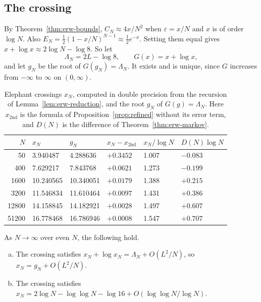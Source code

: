 \subsection{The crossing}

By Theorem~\ref{thm:erw-bounds},
$C_N\approx4x/N^2$ when $\varepsilon=x/N$ and $x$ is of order $\log N$. Also
$E_N=\frac12(1-x/N)^{N-1}\approx\frac12e^{-x}$. Setting them equal gives
$x+\log x\approx2\log N-\log8$. So let
\[
 \Lambda_N=2L-\log8,\qquad G(x)=x+\log x,
\]
and let $g_N$ be the root of $G(g_N)=\Lambda_N$. It exists and is unique,
since $G$ increases from $-\infty$ to $\infty$ on $(0,\infty)$.

\begin{table}[t]
\centering\small
\begin{tabular}{@{}rlllll@{}}
\toprule
$N$ & $x_N$ & $g_N$ & $x_N-x_{\mathrm{2nd}}$ & $x_N/\log N$ & $D(N)\log N$\\
\midrule
50 & 3.940487 & 4.288636 & $+0.3452$ & 1.007 & $-0.083$\\
400 & 7.629217 & 7.843768 & $+0.0621$ & 1.273 & $-0.199$\\
1600 & 10.240565 & 10.340051 & $+0.0179$ & 1.388 & $+0.215$\\
3200 & 11.546834 & 11.610464 & $+0.0097$ & 1.431 & $+0.386$\\
12800 & 14.158845 & 14.182921 & $+0.0028$ & 1.497 & $+0.607$\\
51200 & 16.778468 & 16.786946 & $+0.0008$ & 1.547 & $+0.707$\\
\bottomrule
\end{tabular}
\caption{Elephant crossings $x_N$, computed in double precision from the
recursion of Lemma~\ref{lem:erw-reduction}, and the root $g_N$ of
$G(g)=\Lambda_N$. Here $x_{\mathrm{2nd}}$ is the formula of
Proposition~\ref{prop:refined} without its error term, and $D(N)$ is the
difference of Theorem~\ref{thm:erw-markov}.}
\label{tab:erw-crossing}
\end{table}

\begin{theorem}\label{thm:erw-crossing}
As $N\to\infty$ over even $N$, the following hold.
\begin{enumerate}[(a)]
\item The crossing satisfies $x_N+\log x_N=\Lambda_N+O(L^2/N)$, so
$x_N=g_N+O(L^2/N)$.
\item The crossing satisfies
$x_N=2\log N-\log\log N-\log16+O(\log\log N/\log N)$.
\end{enumerate}
\end{theorem}

